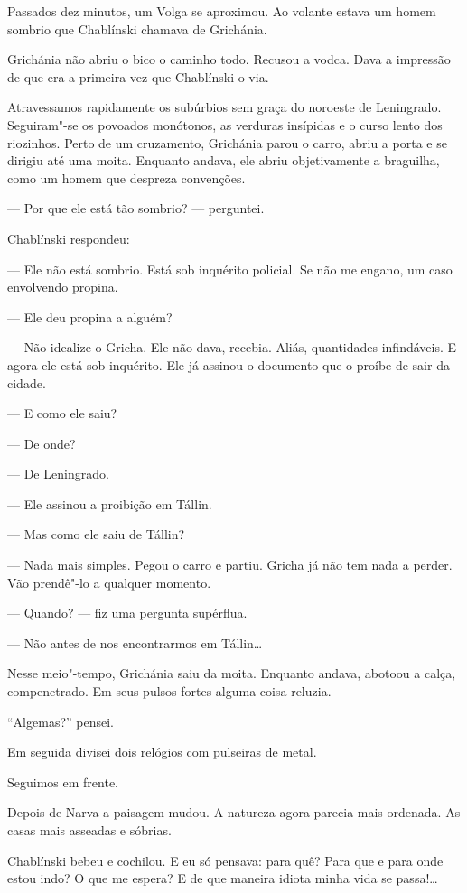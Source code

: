 Passados dez minutos, um Volga se aproximou. Ao volante estava um homem
sombrio que Chablínski chamava de Grichánia.

Grichánia não abriu o bico o caminho todo. Recusou a vodca. Dava a
impressão de que era a primeira vez que Chablínski o via.

Atravessamos rapidamente os subúrbios sem graça do noroeste de
Leningrado. Seguiram"-se os povoados monótonos, as verduras insípidas e o
curso lento dos riozinhos. Perto de um cruzamento, Grichánia parou o
carro, abriu a porta e se dirigiu até uma moita. Enquanto andava, ele
abriu objetivamente a braguilha, como um homem que despreza convenções.

--- Por que ele está tão sombrio? --- perguntei.

Chablínski respondeu:

--- Ele não está sombrio. Está sob inquérito policial. Se não me engano,
um caso envolvendo propina.

--- Ele deu propina a alguém?

--- Não idealize o Gricha. Ele não dava, recebia. Aliás, quantidades
infindáveis. E agora ele está sob inquérito. Ele já assinou o documento
que o proíbe de sair da cidade.

--- E como ele saiu?

--- De onde?

--- De Leningrado.

--- Ele assinou a proibição em Tállin.

--- Mas como ele saiu de Tállin?

--- Nada mais simples. Pegou o carro e partiu. Gricha já não tem nada a
perder. Vão prendê"-lo a qualquer momento.

--- Quando? --- fiz uma pergunta supérflua.

--- Não antes de nos encontrarmos em Tállin\ldots{}

Nesse meio"-tempo, Grichánia saiu da moita. Enquanto andava, abotoou a
calça, compenetrado. Em seus pulsos fortes alguma coisa reluzia.

``Algemas?'' pensei.

Em seguida divisei dois relógios com pulseiras de metal.

Seguimos em frente.

Depois de Narva a paisagem mudou. A natureza agora parecia mais
ordenada. As casas mais asseadas e sóbrias.

Chablínski bebeu e cochilou. E eu só pensava: para quê? Para que e para
onde estou indo? O que me espera? E de que maneira idiota minha vida se
passa!\ldots{}


